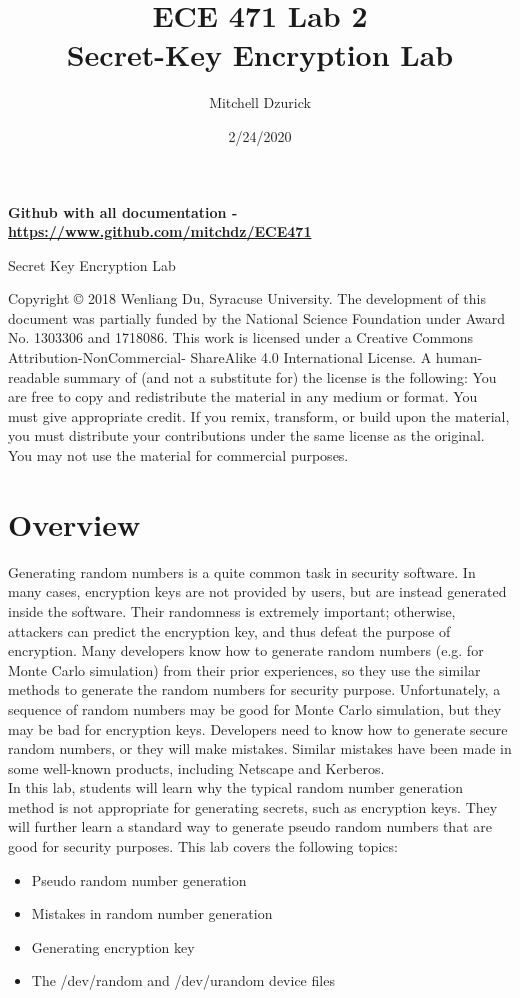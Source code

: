 \documentclass[12pt]{article}
\title {{\bf ECE 471 Lab 2} \\
\large{Secret-Key Encryption Lab}}
\author{Mitchell Dzurick}
\date{2/24/2020}
\newcommand\tab[1][0.5cm]{\hspace*{#1}}
\begin{document}
\maketitle
\textbf{Github with all documentation - \url{https://www.github.com/mitchdz/ECE471}}
\tableofcontents 

\clearpage


Secret Key Encryption Lab

Copyright © 2018 Wenliang Du, Syracuse University. The development of this document was partially funded by the National
Science Foundation under Award No. 1303306 and 1718086. This work is licensed under a Creative Commons
Attribution-NonCommercial- ShareAlike 4.0 International License. A human-readable summary of (and not a substitute for)
the license is the following: You are free to copy and redistribute the material in any medium or format. You must give
appropriate credit. If you remix, transform, or build upon the material, you must distribute your contributions under the
same license as the original. You may not use the material for commercial purposes.

\section{Overview}

Generating random numbers is a quite common task in security software. In many cases, encryption keys
are not provided by users, but are instead generated inside the software. Their randomness is extremely
important; otherwise, attackers can predict the encryption key, and thus defeat the purpose of encryption.
Many developers know how to generate random numbers (e.g. for Monte Carlo simulation) from their
prior experiences, so they use the similar methods to generate the random numbers for security purpose.
Unfortunately, a sequence of random numbers may be good for Monte Carlo simulation, but they may be
bad for encryption keys. Developers need to know how to generate secure random numbers, or they will
make mistakes. Similar mistakes have been made in some well-known products, including Netscape and
Kerberos. \\
\tab In this lab, students will learn why the typical random number generation method is not appropriate
for generating secrets, such as encryption keys. They will further learn a standard way to generate pseudo
random numbers that are good for security purposes. This lab covers the following topics:


    \begin{itemize}
        \item Pseudo random number generation
        \item Mistakes in random number generation
        \item Generating encryption key
        \item The /dev/random and /dev/urandom device files
    \end{itemize}
\end{document}
